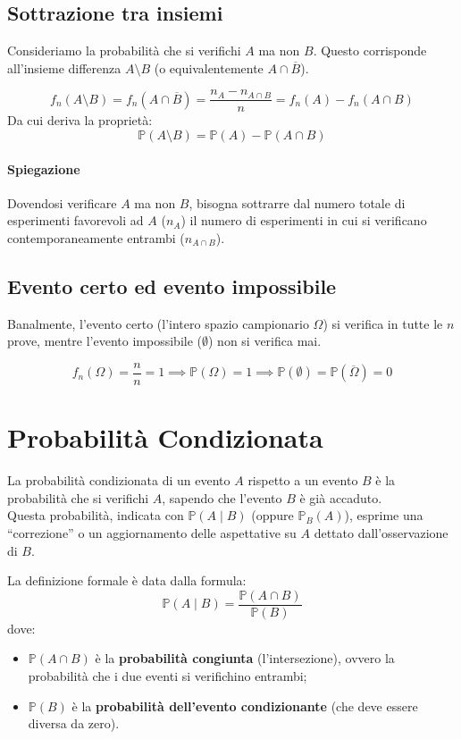 \subsection{Sottrazione tra insiemi}
Consideriamo la probabilità che si verifichi $A$ ma non $B$. Questo corrisponde all'insieme differenza $A \setminus B$ (o equivalentemente $A \cap \overline{B}$).

\[
f_n(A \setminus B) = f_n(A \cap \overline{B}) = \frac{n_A - n_{A \cap B}}{n} = f_n(A) - f_n(A \cap B)
\]
Da cui deriva la proprietà:
\[
\mathbb{P}(A \setminus B) = \mathbb{P}(A) - \mathbb{P}(A \cap B)
\]

\paragraph{Spiegazione}
Dovendosi verificare $A$ ma non $B$, bisogna sottrarre dal numero totale di esperimenti favorevoli ad $A$ ($n_A$) il numero di esperimenti in cui si verificano contemporaneamente entrambi ($n_{A \cap B}$).

\subsection{Evento certo ed evento impossibile}
Banalmente, l'evento certo (l'intero spazio campionario $\Omega$) si verifica in tutte le $n$ prove, mentre l'evento impossibile ($\emptyset$) non si verifica mai.

\[
f_n(\Omega) = \frac{n}{n} = 1 \implies \mathbb{P}(\Omega) = 1 \implies \mathbb{P}(\emptyset) = \mathbb{P}(\overline{\Omega}) = 0
\]

\section{Probabilità Condizionata}

La probabilità condizionata di un evento $A$ rispetto a un evento $B$ è la probabilità che si verifichi $A$, sapendo che l'evento $B$ è già accaduto.
\\Questa probabilità, indicata con $\mathbb{P}(A \mid B)$ (oppure $\mathbb{P}_B(A)$), esprime una ``correzione'' o un aggiornamento delle aspettative su $A$ dettato dall'osservazione di $B$.

La definizione formale è data dalla formula:
\[
\mathbb{P}(A \mid B) = \frac{\mathbb{P}(A \cap B)}{\mathbb{P}(B)}
\]
dove:
\begin{itemize}
    \item $\mathbb{P}(A \cap B)$ è la \textbf{probabilità congiunta} (l'intersezione), ovvero la probabilità che i due eventi si verifichino entrambi;
    \item $\mathbb{P}(B)$ è la \textbf{probabilità dell'evento condizionante} (che deve essere diversa da zero).
\end{itemize}

